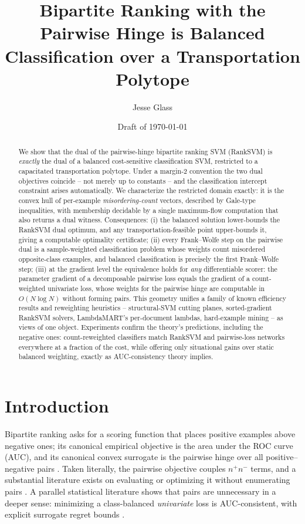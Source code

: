 \documentclass[11pt]{article}
\title{Bipartite Ranking with the Pairwise Hinge is Balanced
Classification over a Transportation Polytope}
\author{Jesse Glass}
\date{Draft of \today}
\theoremstyle{remark}
\begin{document}
\maketitle

\begin{abstract}
We show that the dual of the pairwise-hinge bipartite ranking SVM (RankSVM)
is \emph{exactly} the dual of a balanced cost-sensitive classification SVM,
restricted to a capacitated transportation polytope. Under a margin-2
convention the two dual objectives coincide -- not merely up to constants --
and the classification intercept constraint arises automatically. We
characterize the restricted domain exactly: it is the convex hull of
per-example \emph{misordering-count} vectors, described by Gale-type
inequalities, with membership decidable by a single maximum-flow computation
that also returns a dual witness. Consequences: (i) the balanced solution
lower-bounds the RankSVM dual optimum, and any transportation-feasible point
upper-bounds it, giving a computable optimality certificate; (ii) every
Frank--Wolfe step on the pairwise dual is a sample-weighted classification
problem whose weights count misordered opposite-class examples, and balanced
classification is precisely the first Frank--Wolfe step; (iii) at the
gradient level the equivalence holds for \emph{any} differentiable scorer:
the parameter gradient of a decomposable pairwise loss equals the gradient of
a count-weighted univariate loss, whose weights for the pairwise hinge are
computable in $O(N\log N)$ without forming pairs. This geometry unifies a family of known efficiency results and
reweighting heuristics -- structural-SVM cutting planes, sorted-gradient
RankSVM solvers, LambdaMART's per-document lambdas, hard-example mining --
as views of one object. Experiments confirm the theory's predictions,
including the negative ones: count-reweighted classifiers match RankSVM and
pairwise-loss networks everywhere at a fraction of the cost, while offering
only situational gains over static balanced weighting, exactly as
AUC-consistency theory implies.
\end{abstract}

\section{Introduction}
\label{sec:intro}

Bipartite ranking asks for a scoring function that places positive examples
above negative ones; its canonical empirical objective is the area under the
ROC curve (AUC), and its canonical convex surrogate is the pairwise hinge
over all positive--negative pairs \citep{herbrich2000,joachims2002}. Taken
literally, the pairwise objective couples $n^+ n^-$ terms, and a substantial
literature exists on evaluating or optimizing it without enumerating pairs
\citep{joachims2005,chapelle2010,airola2011,ying2016}. A parallel statistical
literature shows that pairs are unnecessary in a deeper sense: minimizing a
class-balanced \emph{univariate} loss is AUC-consistent, with explicit
surrogate regret bounds \citep{kotlowski2011,agarwal2014}.
\end{document}
